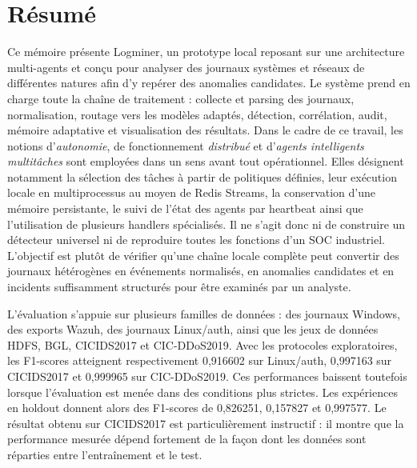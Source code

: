 \documentclass[12pt,a4paper,oneside]{report}
\newcommand{\logminer}{Logminer}
\begin{document}





\chapter*{Résumé}

Ce mémoire présente \logminer{}, un prototype local reposant sur une architecture multi-agents et conçu pour analyser des journaux systèmes et réseaux de différentes natures afin d'y repérer des anomalies candidates. Le système prend en charge toute la chaîne de traitement : collecte et parsing des journaux, normalisation, routage vers les modèles adaptés, détection, corrélation, audit, mémoire adaptative et visualisation des résultats. Dans le cadre de ce travail, les notions d'\textit{autonomie}, de fonctionnement \textit{distribué} et d'\textit{agents intelligents multitâches} sont employées dans un sens avant tout opérationnel. Elles désignent notamment la sélection des tâches à partir de politiques définies, leur exécution locale en multiprocessus au moyen de Redis Streams, la conservation d'une mémoire persistante, le suivi de l'état des agents par heartbeat ainsi que l'utilisation de plusieurs handlers spécialisés. Il ne s'agit donc ni de construire un détecteur universel ni de reproduire toutes les fonctions d'un SOC industriel. L'objectif est plutôt de vérifier qu'une chaîne locale complète peut convertir des journaux hétérogènes en événements normalisés, en anomalies candidates et en incidents suffisamment structurés pour être examinés par un analyste.

L'évaluation s'appuie sur plusieurs familles de données : des journaux Windows, des exports Wazuh, des journaux Linux/auth, ainsi que les jeux de données HDFS, BGL, CICIDS2017 et CIC-DDoS2019. Avec les protocoles exploratoires, les F1-scores atteignent respectivement 0,916602 sur Linux/auth, 0,997163 sur CICIDS2017 et 0,999965 sur CIC-DDoS2019. Ces performances baissent toutefois lorsque l'évaluation est menée dans des conditions plus strictes. Les expériences en holdout donnent alors des F1-scores de 0,826251, 0,157827 et 0,997577. Le résultat obtenu sur CICIDS2017 est particulièrement instructif : il montre que la performance mesurée dépend fortement de la façon dont les données sont réparties entre l'entraînement et le test.
\end{document}
